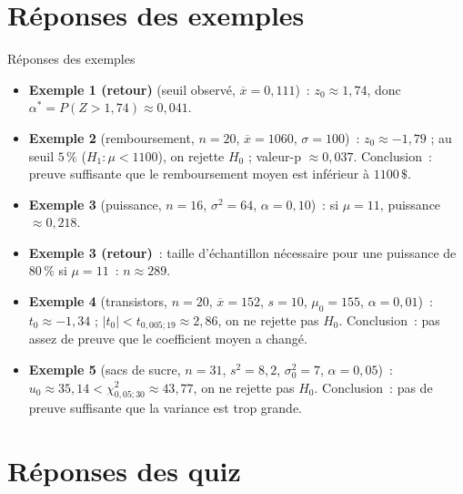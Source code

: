 \documentclass{BeamerTemplate}
\begin{document}
\section{Réponses des exemples}

\begin{frame}[t]{Réponses des exemples}
\footnotesize
\begin{itemize}
\item \textbf{Exemple 1 (retour)} (seuil observé, $\overline x=0{,}111$)~: $z_0\approx 1{,}74$,
donc $\alpha^*=P(Z>1{,}74)\approx 0{,}041$.
\item \textbf{Exemple 2} (remboursement, $n=20$, $\overline x=1060$, $\sigma=100$)~:
$z_0\approx -1{,}79$ ; au seuil $5\,\%$ ($H_1:\mu<1100$), on rejette $H_0$ ; valeur-p
$\approx 0{,}037$. Conclusion~: preuve suffisante que le remboursement moyen est inférieur à
$1100\,\$$.
\item \textbf{Exemple 3} (puissance, $n=16$, $\sigma^2=64$, $\alpha=0{,}10$)~: si $\mu=11$,
puissance $\approx 0{,}218$.
\item \textbf{Exemple 3 (retour)}~: taille d'échantillon nécessaire pour une puissance de
$80\,\%$ si $\mu=11$~: $n\approx 289$.
\item \textbf{Exemple 4} (transistors, $n=20$, $\overline x=152$, $s=10$, $\mu_0=155$,
$\alpha=0{,}01$)~: $t_0\approx -1{,}34$ ; $|t_0|<t_{0{,}005;19}\approx 2{,}86$, on ne rejette pas
$H_0$. Conclusion~: pas assez de preuve que le coefficient moyen a changé.
\item \textbf{Exemple 5} (sacs de sucre, $n=31$, $s^2=8{,}2$, $\sigma_0^2=7$, $\alpha=0{,}05$)~:
$u_0\approx 35{,}14 < \chi^2_{0{,}05;30}\approx 43{,}77$, on ne rejette pas $H_0$. Conclusion~:
pas de preuve suffisante que la variance est trop grande.
\end{itemize}

\end{frame}

\section{Réponses des quiz}
\end{document}
